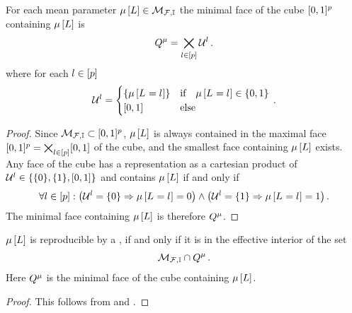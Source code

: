 \begin{lemma}
    \label{lem:minimalContainingFace}
    For each mean parameter $\mu\left[L\right]\in\mathcal{M}_{\mathcal{F},\mathbb{I}}$ the minimal face of the cube $[0,1]^{p}$ containing $\mu\left[L\right]$ is
    \begin{align*}
        Q^{\mu}
        = \bigtimes_{l\in[p]} \mathcal{U}^{l} \, .
    \end{align*}
    where for each $l\in[p]$
    \begin{align*}
        \mathcal{U}^{l} = \begin{cases}
                                   \{\mu\left[L_{}=l_{}\right]\} & \text{if}\quad \mu\left[L_{}=l_{}\right] \in \{0,1\} \\
                                   [0,1] & \text{else}
        \end{cases} \, .
    \end{align*}
\end{lemma}
\begin{proof}
    Since $\mathcal{M}_{\mathcal{F},\mathbb{I}}\subset[0,1]^{p}$, $\mu\left[L\right]$ is always contained in the maximal face $[0,1]^{p}=\bigtimes_{l\in[p]}[0,1]$ of the cube, and the smallest face containing $\mu\left[L\right]$ exists.
    Any face of the cube has a representation as a cartesian product of $\mathcal{U}^{l}\in\{\{0\},\{1\},[0,1]\}$ and contains $\mu\left[L\right]$ if and only if
    \begin{align*}
        \forall{l\in[p]}:{\left(\mathcal{U}^{l}=\{0\} \Rightarrow \mu\left[L_{}=l_{}\right]=0 \right) \land \left(\mathcal{U}^{l}=\{1\} \Rightarrow \mu\left[L_{}=l_{}\right]=1 \right)} \, .
    \end{align*}
    The minimal face containing $\mu\left[L\right]$ is therefore $Q^{\mu}$.
\end{proof}

\begin{lemma}
    $\mu\left[L\right]$ is reproducible by a \HybridLogicNetwork{}, if and only if it is in the effective interior of the set
    \begin{align*}
        \mathcal{M}_{\mathcal{F},\mathbb{I}}\cap Q^{\mu} \, .
    \end{align*}
    Here $Q^{\mu}$ is the minimal face of the cube containing $\mu\left[L\right]$.
\end{lemma}
\begin{proof}
    This follows from  and .
\end{proof}

